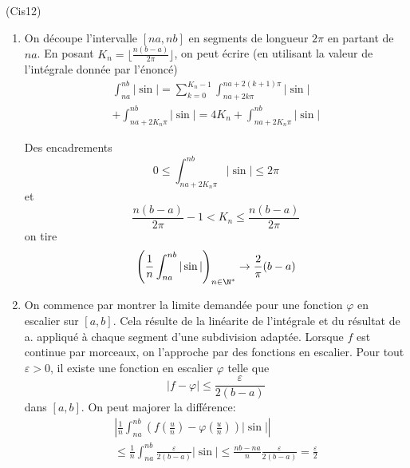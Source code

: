 \begin{tiny}(Cis12)\end{tiny}
\begin{enumerate}
 \item On découpe l'intervalle $[na,nb]$ en segments de longueur $2\pi$ en partant de $na$. En posant $K_n=\lfloor\frac{n(b-a)}{2\pi} \rfloor$, on peut écrire (en utilisant la valeur de l'intégrale donnée par l'énoncé)
\begin{multline*}
 \int_{na}^{nb}|\sin| 
= \sum_{k=0}^{K_n-1}\int_{na+2k\pi}^{na+2(k+1)\pi}|\sin| \\ + \int_{na+2K_n\pi}^{nb}|\sin|
= 4K_n + \int_{na+2K_n\pi}^{nb}|\sin|
\end{multline*}

Des encadrements
\begin{displaymath}
 0\leq \int_{na+2K_n\pi}^{nb}|\sin| \leq 2\pi
\end{displaymath}
et 
\begin{displaymath}
 \frac{n(b-a)}{2\pi}-1 < K_n \leq \frac{n(b-a)}{2\pi}
\end{displaymath}
on tire
\begin{displaymath}
 \left(\frac{1}{n}\int_{na}^{nb}|\sin | \right)_{n\in\N^*} \rightarrow \frac{2}{\pi}(b-a)
\end{displaymath}
\item On commence par montrer la limite demandée pour une fonction $\varphi$ en escalier sur $[a,b]$. Cela résulte de la linéarite de l'intégrale et du résultat de a. appliqué à chaque segment d'une subdivision adaptée.\newline
Lorsque $f$ est continue par morceaux, on l'approche par des fonctions en escalier. Pour tout $\varepsilon >0$, il existe une fonction en escalier $\varphi$ telle que 
\begin{displaymath}
|f-\varphi|\leq \frac{\varepsilon}{2(b-a)} 
\end{displaymath}
dans $[a,b]$. On peut majorer la différence:
\begin{multline*}
 \left\vert\frac{1}{n}\int_{na}^{nb}(f(\frac{u}{n})-\varphi(\frac{u}{n}))|\sin | \right\vert\\
\leq \frac{1}{n}\int_{na}^{nb}\frac{\varepsilon}{2(b-a)}|\sin |\leq \frac{nb-na}{n}\frac{\varepsilon}{2(b-a)}=\frac{\varepsilon}{2}
\end{multline*}

\end{enumerate}
